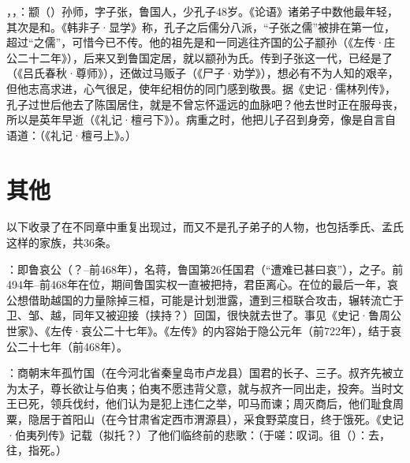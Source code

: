 ，，：颛（）孙师，字子张，鲁国人，少孔子48岁。《论语》诸弟子中数他最年轻，其次是和。《韩非子·显学》称，孔子之后儒分八派，“子张之儒”被排在第一位，超过“之儒”，可惜今已不传。他的祖先是和一同逃往齐国的公子颛孙（《左传·庄公二十二年》），后来又到鲁国定居，就以颛孙为氏。传到子张这一代，已经是了（《吕氏春秋·尊师》），还做过马贩子（《尸子·劝学》），想必有不为人知的艰辛，但他志高求进，心气很足，使年纪相仿的同门感到敬畏。据《史记·儒林列传》，孔子过世后他去了陈国居住，就是不曾忘怀遥远的血脉吧？他去世时正在服母丧，所以是英年早逝（《礼记·檀弓下》）。病重之时，他把儿子召到身旁，像是自言自语道：（《礼记·檀弓上》。）


\lypdfbookmark\section*{其他}

以下收录了在不同章中重复出现过，而又不是孔子弟子的人物，也包括季氏、孟氏这样的家族，共36条。

\bigskip

：即鲁哀公（？--前468年），名蒋，鲁国第26任国君（“遭难已甚曰哀”），之子。前494年--前468年在位，期间鲁国实权一直被把持，君臣离心。在位的最后一年，哀公想借助越国的力量除掉三桓，可能是计划泄露，遭到三桓联合攻击，辗转流亡于卫、邹、越，同年又被迎接（挟持？）回国，很快就去世了。事见《史记·鲁周公世家》、《左传·哀公二十七年》。《左传》的内容始于隐公元年（前722年），结于哀公二十七年（前468年）。%

：商朝末年孤竹国（在今河北省秦皇岛市卢龙县）国君的长子、三子。叔齐先被立为太子，尊长欲让与伯夷；伯夷不愿违背父意，就与叔齐一同出走，投奔。当时文王已死，领兵伐纣，他们认为是犯上违仁之举，叩马而谏；周灭商后，他们耻食周粟，隐居于首阳山（在今甘肃省定西市渭源县），采食野菜度日，终于饿死。《史记·伯夷列传》记载（拟托？）了他们临终前的悲歌：（于嗟：叹词。徂（）：去，往，指死。）

